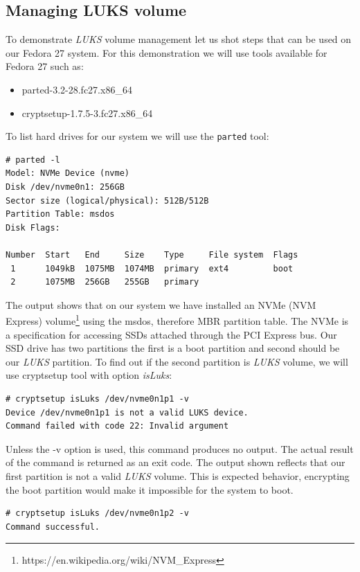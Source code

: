 \subsection{Managing LUKS volume}\label{manageLUKS}

To demonstrate {\it LUKS} volume management let us shot steps that can be used on our Fedora 27 system.
For this demonstration we will use tools available for Fedora 27 such as:\\
\begin{itemize}
    \item parted-3.2-28.fc27.x86\_64
    \item cryptsetup-1.7.5-3.fc27.x86\_64
\end{itemize}
To list hard drives for our system we will use the {\tt parted} tool:
\begin{lstlisting}[columns=fixed,basicstyle=\ttfamily\footnotesize,tabsize=4,backgroundcolor=\color{yellow!10}]
# parted -l
Model: NVMe Device (nvme)
Disk /dev/nvme0n1: 256GB
Sector size (logical/physical): 512B/512B
Partition Table: msdos
Disk Flags:

Number  Start   End     Size    Type     File system  Flags
 1      1049kB  1075MB  1074MB  primary  ext4         boot
 2      1075MB  256GB   255GB   primary
\end{lstlisting}
The output shows that on our system we have installed an NVMe (NVM Express) volume\footnote{https://en.wikipedia.org/wiki/NVM\_Express} using the msdos, therefore MBR partition table.
The NVMe is a specification for accessing SSDs attached through the PCI Express bus.
Our SSD drive has two partitions the first is a boot partition and second should be our {\it LUKS} partition.
To find out if the second partition is {\it LUKS} volume, we will use cryptsetup tool with option {\it isLuks}:
\begin{lstlisting}[columns=fixed,basicstyle=\ttfamily\footnotesize,tabsize=4,backgroundcolor=\color{yellow!10}]
# cryptsetup isLuks /dev/nvme0n1p1 -v
Device /dev/nvme0n1p1 is not a valid LUKS device.
Command failed with code 22: Invalid argument
\end{lstlisting}
Unless the -v option is used, this command produces no output.
The actual result of the command is returned as an exit code.
The output shown reflects that our first partition is not a valid {\it LUKS} volume.
This is expected behavior, encrypting the boot partition would make it impossible for the system to boot.
\begin{lstlisting}[columns=fixed,basicstyle=\ttfamily\footnotesize,tabsize=4,backgroundcolor=\color{yellow!10}]
# cryptsetup isLuks /dev/nvme0n1p2 -v
Command successful.
\end{lstlisting}
